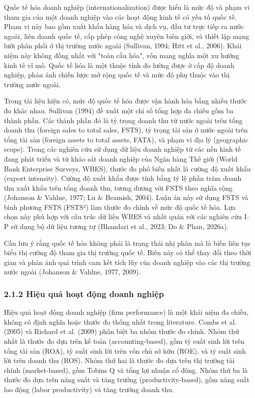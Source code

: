 \documentclass[12pt,a4paper]{article}
\begin{document}
Quốc tế hóa doanh nghiệp (internationalization) được hiểu là mức độ và
phạm vi tham gia của một doanh nghiệp vào các hoạt động kinh tế có yếu
tố quốc tế. Phạm vi này bao gồm xuất khẩu hàng hóa và dịch vụ, đầu tư
trực tiếp ra nước ngoài, liên doanh quốc tế, cấp phép công nghệ xuyên
biên giới, và thiết lập mạng lưới phân phối ở thị trường nước ngoài
(Sullivan, 1994; Hitt et al., 2006). Khái niệm này không đồng nhất với
"toàn cầu hóa", vốn mang nghĩa một xu hướng kinh tế vĩ mô. Quốc tế hóa
là một thuộc tính đo lường được ở cấp độ doanh nghiệp, phản ánh chiến
lược mở rộng quốc tế và mức độ phụ thuộc vào thị trường nước ngoài.

Trong tài liệu hiện có, mức độ quốc tế hóa được vận hành hóa bằng nhiều
thước đo khác nhau. Sullivan (1994) đề xuất một chỉ số tổng hợp đa chiều
gồm ba thành phần. Các thành phần đó là tỷ trọng doanh thu từ nước ngoài
trên tổng doanh thu (foreign sales to total sales, FSTS), tỷ trọng tài
sản ở nước ngoài trên tổng tài sản (foreign assets to total assets,
FATA), và phạm vi địa lý (geographic scope). Trong các nghiên cứu sử
dụng dữ liệu doanh nghiệp từ các nền kinh tế đang phát triển và từ khảo
sát doanh nghiệp của Ngân hàng Thế giới (World Bank Enterprise Surveys,
WBES), thước đo phổ biến nhất là cường độ xuất khẩu (export intensity).
Cường độ xuất khẩu được tính bằng tỷ lệ phần trăm doanh thu xuất khẩu
trên tổng doanh thu, tương đương với FSTS theo nghĩa rộng (Johanson \&
Vahlne, 1977; Lu \& Beamish, 2004). Luận án này sử dụng FSTS và bình
phương FSTS (FSTS²) làm thước đo chính về mức độ quốc tế hóa. Lựa chọn
này phù hợp với cấu trúc dữ liệu WBES và nhất quán với các nghiên cứu
I--P sử dụng bộ dữ liệu tương tự (Bhandari et al., 2023; Do \& Phan,
2026a).

Cần lưu ý rằng quốc tế hóa không phải là trạng thái nhị phân mà là biến
liên tục biểu thị cường độ tham gia thị trường quốc tế. Biến này có thể
thay đổi theo thời gian và phản ánh quá trình cam kết tích lũy của doanh
nghiệp vào các thị trường nước ngoài (Johanson \& Vahlne, 1977, 2009).

\hypertarget{212-hiux1ec7u-quux1ea3-houx1ea1t-ux111ux1ed9ng-doanh-nghiux1ec7p}{%
\subsubsection{2.1.2 Hiệu quả hoạt động doanh
nghiệp}\label{212-hiux1ec7u-quux1ea3-houx1ea1t-ux111ux1ed9ng-doanh-nghiux1ec7p}}

Hiệu quả hoạt động doanh nghiệp (firm performance) là một khái niệm đa
chiều, không có định nghĩa hoặc thước đo thống nhất trong literature.
Combs et al. (2005) và Richard et al. (2009) phân biệt ba nhóm thước đo
chính. Nhóm thứ nhất là thước đo dựa trên kế toán (accounting-based),
gồm tỷ suất sinh lời trên tổng tài sản (ROA), tỷ suất sinh lời trên vốn
chủ sở hữu (ROE), và tỷ suất sinh lời trên doanh thu (ROS). Nhóm thứ hai
là thước đo dựa trên thị trường tài chính (market-based), gồm
Tobin\textquotesingle s Q và tổng lợi nhuận cổ đông. Nhóm thứ ba là
thước đo dựa trên năng suất và tăng trưởng (productivity-based), gồm
năng suất lao động (labor productivity) và tăng trưởng doanh thu.
\end{document}
